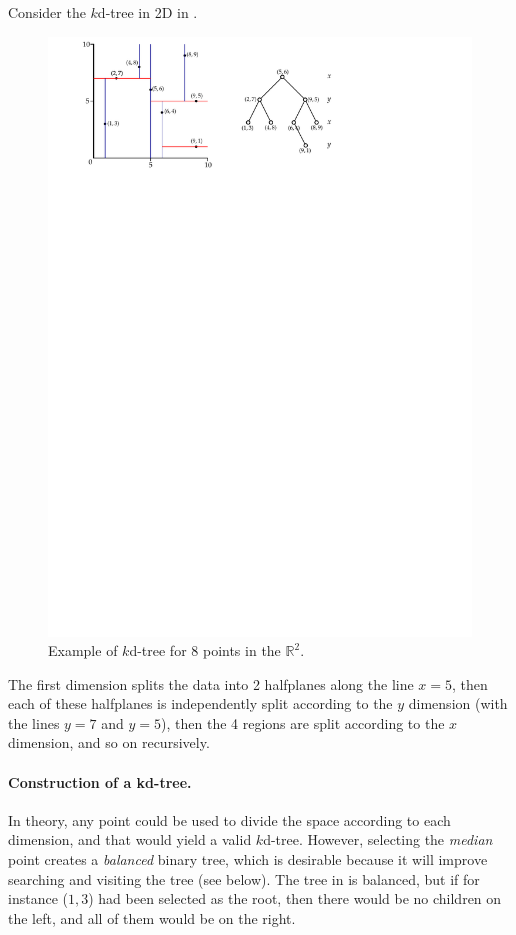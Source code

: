 Consider the $k$d-tree in 2D in .
\begin{figure}[tbp]
  \centering
  \includegraphics[width=0.9\linewidth]{figs/kdtree2}
  \caption{Example of $k$d-tree for 8 points in the $\mathbb{R}^2$.}%
\end{figure}
The first dimension splits the data into 2 halfplanes along the line $x=5$, then each of these halfplanes is independently split according to the $y$ dimension (with the lines $y=7$ and $y=5$), then the 4 regions are split according to the $x$ dimension, and so on recursively.

\paragraph{Construction of a kd-tree.}
In theory, any point could be used to divide the space according to each dimension, and that would yield a valid $k$d-tree.
However, selecting the \emph{median} point creates a \emph{balanced} binary tree, which is desirable because it will improve searching and visiting the tree (see below).
The tree in  is balanced, but if for instance ($1,3$) had been selected as the root, then there would be no children on the left, and all of them would be on the right.

